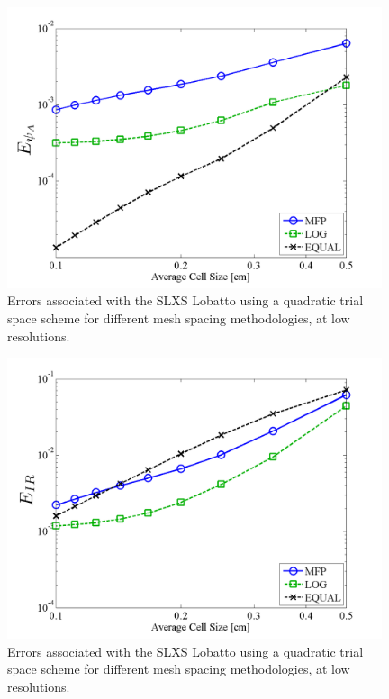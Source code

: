 %
\begin{figure}[!htp]
\centering
\includegraphics[width=11cm]{chapter3_variable_xs/LOW_RES_P2_LOBATTO_E_PSI_A.png}
\caption{Errors associated with the SLXS Lobatto using a quadratic trial space scheme for different mesh spacing methodologies, at low resolutions.}
\label{fig:low_res_lobatto_psi_A}
\end{figure}
%
%
\begin{figure}[!hbp]
\centering
\includegraphics[width=11cm]{chapter3_variable_xs/LOW_RES_P2_LOBATTO_E_IR.png}
\caption{Errors associated with the SLXS Lobatto using a quadratic trial space scheme for different mesh spacing methodologies, at low resolutions.}
\label{fig:low_res_lobatto_ir}
\end{figure}

